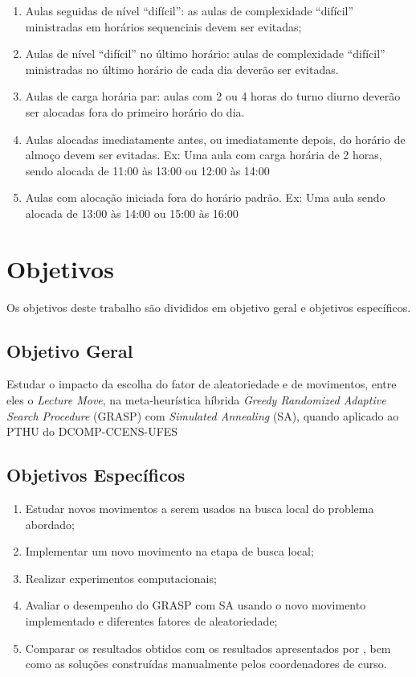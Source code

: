 \begin{itemize}
\begin{enumerate}[resume]
		\item Aulas seguidas de nível “difícil”: as aulas de complexidade “difícil” ministradas em horários sequenciais devem ser evitadas;
		\item Aulas de nível “difícil” no último horário: aulas de complexidade “difícil” ministradas no último horário de cada dia deverão ser evitadas.
		\item Aulas de carga horária par: aulas com 2 ou 4 horas do turno diurno deverão ser alocadas fora do primeiro horário do dia.
		\item Aulas alocadas imediatamente antes, ou imediatamente depois, do horário de almoço devem ser evitadas. Ex: Uma aula com carga horária de 2 horas, sendo alocada de 11:00 às 13:00 ou 12:00 às 14:00
		\item Aulas com alocação iniciada fora do horário padrão. Ex: Uma aula sendo alocada de 13:00 às 14:00 ou 15:00 às 16:00
    \end{enumerate}
\end{itemize}

\section{Objetivos}
\label{sec-intro-objetivos}
Os objetivos deste trabalho são divididos em objetivo geral e objetivos específicos.

\subsection{Objetivo Geral}
\label{sec-intro-obg-geral}
Estudar o  impacto da escolha do fator de aleatoriedade e de movimentos, entre eles o \textit{Lecture Move}, na meta-heurística híbrida \textit{Greedy Randomized Adaptive Search Procedure} (GRASP) com \textit{Simulated Annealing} (SA), quando aplicado ao PTHU do DCOMP-CCENS-UFES

\subsection{Objetivos Específicos}
\label{sec-intro-obg-esp}
\begin{enumerate}[label=(\alph*)]
    \item Estudar novos movimentos a serem usados na busca local do problema abordado;
    \item Implementar um novo movimento na etapa de busca local;
    \item Realizar experimentos computacionais;
    \item Avaliar o desempenho do GRASP com SA usando o novo movimento implementado e diferentes fatores de aleatoriedade;
    \item Comparar os resultados obtidos com os resultados apresentados por , bem como as soluções construídas manualmente pelos coordenadores de curso.
    
\end{enumerate}